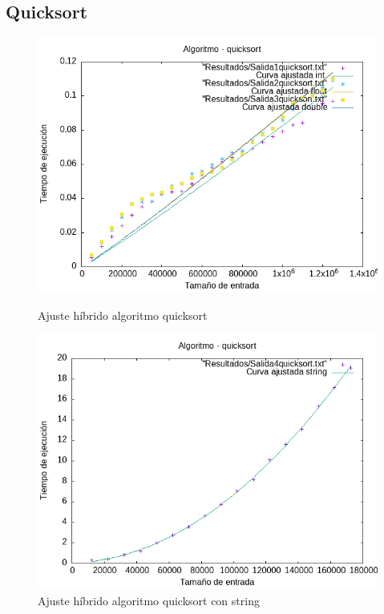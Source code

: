 \documentclass[11pt]{article}
\begin{document}
\subsection*{Quicksort}
\begin{figure}[H]
    \begin{minipage}{0.5\textwidth}
        \centering
        \includegraphics[width=\linewidth]{assets/AjusteHibrido_latex/Hibridoquicksort/quicksort_hib.png}
        \caption{Ajuste híbrido algoritmo quicksort}
        \label{fig:quicksort}
    \end{minipage}%
    \begin{minipage}{0.5\textwidth}
        \centering
        \includegraphics[width=\linewidth]{assets/AjusteHibrido_latex/Hibridoquicksort/quicksortstring_hib.png}
        \caption{Ajuste híbrido algoritmo quicksort con string}
        \label{fig:quicksort}
    \end{minipage}
\end{figure}
\end{document}
